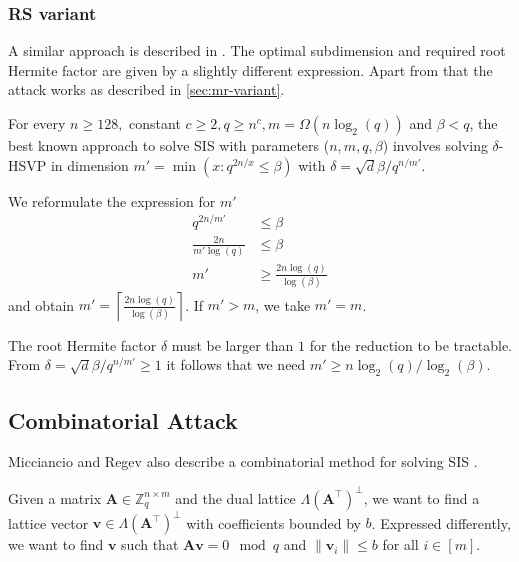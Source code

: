 \subsubsection{RS variant \cite{RS10}}

A similar approach is described in \cite{RS10}. The optimal subdimension and required root Hermite factor are given by a slightly different expression. Apart from that the attack works as described in \cref{sec:mr-variant}.

\begin{theorem}
  For every $n \geq 128,$ constant $c \geq 2, q \geq n^c, m = \Omega(n \log_2(q))$ and $\beta < q$, the best known approach to solve SIS with parameters ($n, m, q, \beta$) involves solving $\delta$-HSVP in dimension $m' = \min(x : q^{2n/x} \leq \beta)$ with $\delta = \sqrt{d}{\beta / q^{n/m'}}$.
\end{theorem}

We reformulate the expression for $m'$
\begin{align}
  q^{2n / m'}           & \leq \beta                          \\
  \frac{2n}{m' \log(q)} & \leq \beta                          \\
  m'                    & \geq \frac{2n \log(q)}{\log(\beta)}
\end{align}
and obtain $m' = \left\lceil \frac{2n \log(q)}{\log(\beta)} \right\rceil$. If $m' > m$, we take $m' = m$.

The root Hermite factor $\delta$ must be larger than $1$ for the reduction to be tractable. From $\delta = \sqrt{d}{\beta / q^{n/m'}} \geq 1$ it follows that we need $m' \geq n \log_2(q) / \log_2(\beta)$.



\subsection[Combinatorial Attack]{Combinatorial Attack \cite{MR09}}
Micciancio and Regev also describe a combinatorial method for solving SIS \cite{MR09}.

Given a matrix $\mathbf{A} \in \mathbb{Z}_q^{n \times m}$ and the dual lattice $\Lambda(\mathbf{A}^\intercal)^{\perp}$, we want to find a lattice vector $\mathbf{v} \in \Lambda(\mathbf{A}^\intercal)^{\perp}$ with coefficients bounded by $b$. Expressed differently, we want to find $\mathbf{v}$ such that $\mathbf{A}\mathbf{v} = 0 \mod q$ and $\|\mathbf{v}_i\| \leq b$ for all $i \in [m]$.

